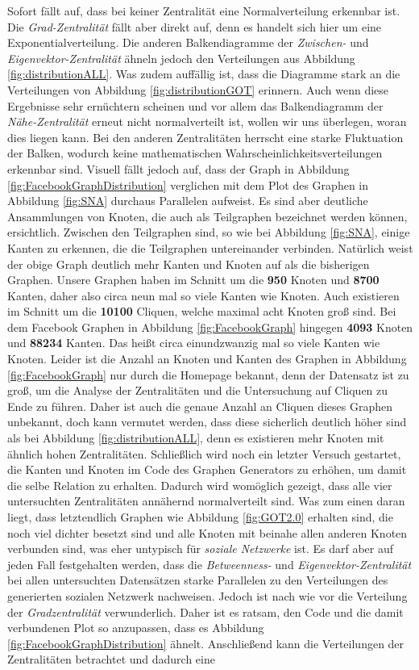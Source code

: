 Sofort fällt auf, dass bei keiner Zentralität eine Normalverteilung erkennbar ist. Die \textit{Grad-Zentralität} fällt aber direkt auf, denn es handelt sich hier um eine Exponentialverteilung. Die anderen Balkendiagramme der \textit{Zwischen-} und \textit{Eigenvektor-Zentralität} ähneln jedoch den Verteilungen aus Abbildung \ref{fig:distributionALL}. Was zudem auffällig ist, dass die Diagramme stark an die Verteilungen von Abbildung \ref{fig:distributionGOT} erinnern. Auch wenn diese Ergebnisse sehr ernüchtern scheinen und vor allem das Balkendiagramm der \textit{Nähe-Zentralität} erneut nicht normalverteilt ist, wollen wir uns überlegen, woran dies liegen kann. Bei den anderen Zentralitäten herrscht eine starke Fluktuation der Balken, wodurch keine mathematischen Wahrscheinlichkeitsverteilungen erkennbar sind. Visuell fällt jedoch auf, dass der Graph in Abbildung \ref{fig:FacebookGraphDistribution} verglichen mit dem Plot des Graphen in Abbildung \ref{fig:SNA} durchaus Parallelen aufweist. Es sind aber deutliche Ansammlungen von Knoten, die auch als Teilgraphen bezeichnet werden können, ersichtlich. Zwischen den Teilgraphen sind, so wie bei Abbildung \ref{fig:SNA}, einige Kanten zu erkennen, die die Teilgraphen untereinander verbinden. Natürlich weist der obige Graph deutlich mehr Kanten und Knoten auf als die bisherigen Graphen. Unsere Graphen haben im Schnitt um die \textbf{950} Knoten und \textbf{8700} Kanten, daher also circa neun mal so viele Kanten wie Knoten. Auch existieren im Schnitt um die \textbf{10100} Cliquen, welche maximal acht Knoten groß sind. Bei dem Facebook Graphen in Abbildung \ref{fig:FacebookGraph} hingegen \textbf{4093} Knoten und \textbf{88234} Kanten. Das heißt circa einundzwanzig mal so viele Kanten wie Knoten. Leider ist die Anzahl an Knoten und Kanten des Graphen in Abbildung \ref{fig:FacebookGraph} nur durch die Homepage \cite{FBData} bekannt, denn der Datensatz ist zu groß, um die Analyse der Zentralitäten und die Untersuchung auf Cliquen zu Ende zu führen. Daher ist auch die genaue Anzahl an Cliquen dieses Graphen unbekannt, doch kann vermutet werden, dass diese sicherlich deutlich höher sind als bei Abbildung \ref{fig:distributionALL}, denn es existieren mehr Knoten mit ähnlich hohen Zentralitäten. Schließlich wird noch ein letzter Versuch gestartet, die Kanten und Knoten im Code des Graphen Generators zu erhöhen, um damit die selbe Relation zu erhalten. Dadurch wird womöglich gezeigt, dass alle vier untersuchten Zentralitäten annähernd normalverteilt sind. Was zum einen daran liegt, dass letztendlich Graphen wie Abbildung \ref{fig:GOT2.0} erhalten sind, die noch viel dichter besetzt sind und alle Knoten mit beinahe allen anderen Knoten verbunden sind, was eher untypisch für \textit{soziale Netzwerke} ist. Es darf aber auf jeden Fall festgehalten werden, dass die \textit{Betweenness-} und \textit{Eigenvektor-Zentralität} bei allen untersuchten Datensätzen starke Parallelen zu den Verteilungen des generierten sozialen Netzwerk nachweisen. Jedoch ist nach wie vor die Verteilung der \textit{Gradzentralität} verwunderlich. Daher ist es ratsam, den Code und die damit verbundenen Plot so anzupassen, dass es Abbildung \ref{fig:FacebookGraphDistribution} ähnelt. Anschließend kann die Verteilungen der Zentralitäten betrachtet und dadurch eine 